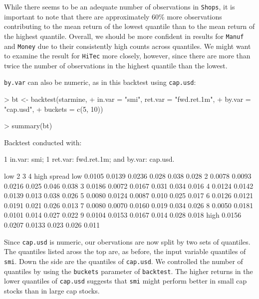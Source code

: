 \documentclass[a4paper]{report}
\begin{document}
\begin{article}
While there seems to be an adequate number of observations in
\texttt{Shops}, it is important to note that there are approximately
60\% more observations contributing to the mean return of the lowest
quantile than to the mean return of the highest quantile.  Overall, we
should be more confident in results for \texttt{Manuf} and
\texttt{Money} due to their consistently high counts across quantiles.
We might want to examine the result for \texttt{HiTec} more closely,
however, since there are more than twice the number of observations in
the highest quantile than the lowest.

\texttt{by.var} can also be numeric, as in this backtest using
\texttt{cap.usd}:


\begin{Schunk}
\begin{Sinput}
> bt <- backtest(starmine, 
+     in.var = "smi", ret.var = "fwd.ret.1m", 
+     by.var = "cap.usd", 
+     buckets = c(5, 10))
\end{Sinput}
\end{Schunk}


\begin{Schunk}
\begin{Sinput}
> summary(bt)
\end{Sinput}
\begin{Soutput}
Backtest conducted with:

1 in.var: smi;
1 ret.var: fwd.ret.1m;
and by.var: cap.usd.

        low      2      3     4  high spread
low  0.0105 0.0139 0.0236 0.028 0.038  0.028
2    0.0078 0.0093 0.0216 0.025 0.046  0.038
3    0.0186 0.0072 0.0167 0.031 0.034  0.016
4    0.0124 0.0142 0.0139 0.013 0.038  0.026
5    0.0080 0.0124 0.0087 0.010 0.025  0.017
6    0.0126 0.0121 0.0191 0.021 0.026  0.013
7    0.0080 0.0070 0.0160 0.019 0.034  0.026
8    0.0050 0.0181 0.0101 0.014 0.027  0.022
9    0.0104 0.0153 0.0167 0.014 0.028  0.018
high 0.0156 0.0207 0.0133 0.023 0.026  0.011
\end{Soutput}
\end{Schunk}

Since \texttt{cap.usd} is numeric, our obervations are now split by
two sets of quantiles.  The quantiles listed aross the top are, as
before, the input variable quantiles of \texttt{smi}.  Down the side
are the quantiles of \texttt{cap.usd}.  We controlled the number of
quantiles by using the \texttt{buckets} parameter of
\texttt{backtest}. The higher returns in the lower quantiles of
\texttt{cap.usd} suggests that \texttt{smi} might perform better in
small cap stocks than in large cap stocks.


\end{article}
\end{document}
